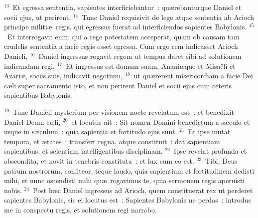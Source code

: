 ${}^{13}$~Et egressa sententia, sapientes interficiebantur~: qu\ae rebanturque Daniel et socii ejus, ut perirent.
${}^{14}$~Tunc Daniel requisivit de lege atque sententia ab Arioch principe militi\ae\ regis, qui egressus fuerat ad interficiendos sapientes Babylonis.
${}^{15}$~Et interrogavit eum, qui a rege potestatem acceperat, quam ob causam tam crudelis sententia a facie regis esset egressa. Cum ergo rem indicasset Arioch Danieli,
${}^{16}$~Daniel ingressus rogavit regem ut tempus daret sibi ad solutionem indicandam regi.
${}^{17}$~Et ingressus est domum suam, Anani\ae que et Misa\"eli et Azari\ae , sociis suis, indicavit negotium,
${}^{18}$~ut qu\ae rerent misericordiam a facie Dei c\ae li super sacramento isto, et non perirent Daniel et socii ejus cum ceteris sapientibus Babylonis.


${}^{19}$~Tunc Danieli mysterium per visionem nocte revelatum est~: et benedixit Daniel Deum c\ae li,
${}^{20}$~et locutus ait~: Sit nomen Domini benedictum a s\ae culo et usque in s\ae culum~: quia sapientia et fortitudo ejus sunt.
${}^{21}$~Et ipse mutat tempora, et \ae tates~: transfert regna, atque constituit~: dat sapientiam sapientibus, et scientiam intelligentibus disciplinam.
${}^{22}$~Ipse revelat profunda et abscondita, et novit in tenebris constituta~: et lux cum eo est.
${}^{23}$~Tibi, Deus patrum nostrorum, confiteor, teque laudo, quia sapientiam et fortitudinem dedisti mihi, et nunc ostendisti mihi qu\ae\ rogavimus te, quia sermonem regis aperuisti nobis.
${}^{24}$~Post h\ae c Daniel ingressus ad Arioch, quem constituerat rex ut perderet sapientes Babylonis, sic ei locutus est~: Sapientes Babylonis ne perdas~: introduc me in conspectu regis, et solutionem regi narrabo.


